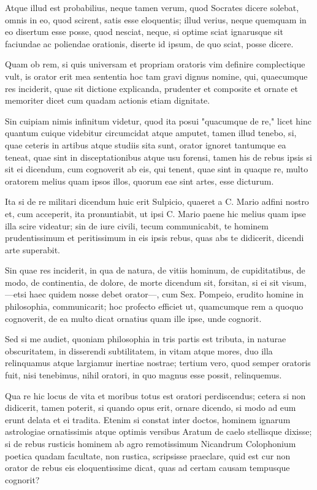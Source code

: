  Atque illud est probabilius, neque tamen verum, quod Socrates dicere solebat, omnis in eo, quod scirent, satis esse eloquentis; illud verius, neque quemquam in eo disertum esse posse, quod nesciat, neque, si optime sciat ignarusque sit faciundae ac poliendae orationis, diserte id ipsum, de quo sciat, posse dicere.

 Quam ob rem, si quis universam et propriam oratoris vim definire complectique vult, is orator erit mea sententia hoc tam gravi dignus nomine, qui, quaecumque res inciderit, quae sit dictione explicanda, prudenter et composite et ornate et memoriter dicet cum quadam actionis etiam dignitate.

 Sin cuipiam nimis infinitum videtur, quod ita posui "quacumque de re," licet hinc quantum cuique videbitur circumcidat atque amputet, tamen illud tenebo, si, quae ceteris in artibus atque studiis sita sunt, orator ignoret tantumque ea teneat, quae sint in disceptationibus atque usu forensi, tamen his de rebus ipsis si sit ei dicendum, cum cognoverit ab eis, qui tenent, quae sint in quaque re, multo oratorem melius quam ipsos illos, quorum eae sint artes, esse dicturum.

 Ita si de re militari dicendum huic erit Sulpicio, quaeret a C. Mario adfini nostro et, cum acceperit, ita pronuntiabit, ut ipsi C. Mario paene hic melius quam ipse illa scire videatur; sin de iure civili, tecum communicabit, te hominem prudentissimum et peritissimum in eis ipsis rebus, quas abs te didicerit, dicendi arte superabit.

 Sin quae res inciderit, in qua de natura, de vitiis hominum, de cupiditatibus, de modo, de continentia, de dolore, de morte dicendum sit, forsitan, si ei sit visum,—etsi haec quidem nosse debet orator—, cum Sex. Pompeio, erudito homine in philosophia, communicarit; hoc profecto efficiet ut, quamcumque rem a quoquo cognoverit, de ea multo dicat ornatius quam ille ipse, unde cognorit.

 Sed si me audiet, quoniam philosophia in tris partis est tributa, in naturae obscuritatem, in disserendi subtilitatem, in vitam atque mores, duo illa relinquamus atque largiamur inertiae nostrae; tertium vero, quod semper oratoris fuit, nisi tenebimus, nihil oratori, in quo magnus esse possit, relinquemus.

 Qua re hic locus de vita et moribus totus est oratori perdiscendus; cetera si non didicerit, tamen poterit, si quando opus erit, ornare dicendo, si modo ad eum erunt delata et ei tradita. Etenim si constat inter doctos, hominem ignarum astrologiae ornatissimis atque optimis versibus Aratum de caelo stellisque dixisse; si de rebus rusticis hominem ab agro remotissimum Nicandrum Colophonium poetica quadam facultate, non rustica, scripsisse praeclare, quid est cur non orator de rebus eis eloquentissime dicat, quas ad certam causam tempusque cognorit?

